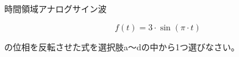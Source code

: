 時間領域アナログサイン波

\[
f(t) = 3 \cdot \sin( \pi \cdot t )
\]

\bigskip
\noindent  の位相を反転させた式を選択肢a〜dの中から1つ選びなさい。
